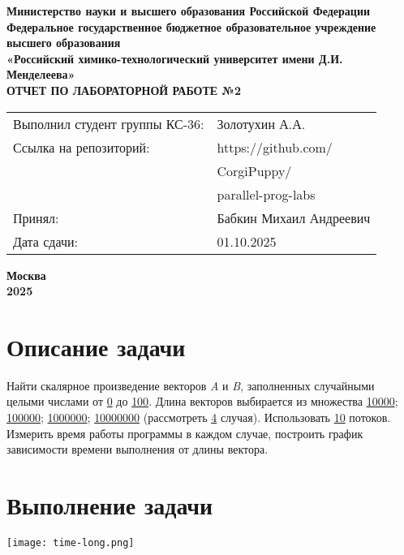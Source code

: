 \documentclass[12pt, a4paper]{report}
\begin{document}
	\begin{titlepage}
		\begin{center}
			\large \textbf{Министерство науки и высшего образования Российской Федерации} \\
			\large \textbf{Федеральное государственное бюджетное образовательное учреждение высшего образования} \\
			\large \textbf{«Российский химико-технологический университет имени Д.И. Менделеева»} \\

			\vspace*{4cm}
			\LARGE \textbf{ОТЧЕТ ПО ЛАБОРАТОРНОЙ РАБОТЕ №2}

			\vspace*{4cm}
			\begin{flushright}
				\Large
				\begin{tabular}{>{\raggedleft\arraybackslash}p{9cm} p{10cm}}
					Выполнил студент группы КС-36: & Золотухин А.А. \\
					Ссылка на репозиторий: & https://github.com/ \\ 
					& CorgiPuppy/ \\
					& parallel-prog-labs \\
					Принял: & Бабкин Михаил Андреевич \\
					Дата сдачи: & 01.10.2025 \\
				\end{tabular}

			\end{flushright}

			\vspace*{6cm}
			\Large \textbf{Москва \\ 2025}
		\end{center}
	\end{titlepage}
	
	\tableofcontents	
	\thispagestyle{empty}
	\newpage

	
	\section*{Описание задачи}
	\large
	Найти скалярное произведение векторов \textit{A} и \textit{B}, заполненных случайными целыми числами от \underline{0} до \underline{100}. Длина векторов выбирается из множества {\underline{10000}; \underline{100000}; \underline{1000000}; \underline{10000000}} (рассмотреть \underline{4} случая). Использовать \underline{10} потоков. Измерить время работы программы в каждом случае, построить график зависимости времени выполнения от длины вектора.	
	\section*{Выполнение задачи}
	\large

	\lstset{style=mystyle}
	

	\begin{center}
		\texttt{[image: time-long.png]}
	\end{center}
\end{document}
